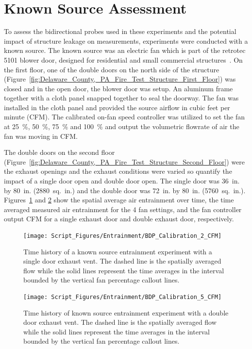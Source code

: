 \documentclass[12pt,oneside]{book}
\begin{document}
\clearpage

\section{Known Source Assessment}
\label{sec:known}

To assess the bidirectional probes used in these experiments and the potential impact of structure leakage on measurements, experiments were conducted with a known source. The known source was an electric fan which is part of the retrotec 5101 blower door, designed for residential and small commercial structures~\cite{RetroTecManual}. On the first floor, one of the double doors on the north side of the structure (Figure~\ref{fig:Delaware_County,_PA_Fire_Test_Structure_First_Floor}) was closed and in the open door, the blower door was setup. An aluminum frame together with a cloth panel snapped together to seal the doorway. The fan was installed in the cloth panel and provided the source airflow in cubic feet per minute (CFM). The calibrated on-fan speed controller was utilized to set the fan at 25~\%, 50~\%, 75~\% and 100~\% and output the volumetric flowrate of air the fan was moving in CFM. 

The double doors on the second floor (Figure~\ref{fig:Delaware_County,_PA_Fire_Test_Structure_Second_Floor}) were the exhaust openings and the exhaust conditions were varied so quantify the impact of a single door open and double door open. The single door was 36~in. by 80~in. (2880~sq.~in.) and the double door was 72~in. by 80~in. (5760~sq.~in.). Figures~\ref{fig:known_single_door} and \ref{fig:known_double_door} show the spatial average air entrainment over time, the time averaged measured air entrainment for the 4 fan settings, and the fan controller output CFM for a single exhaust door and double exhaust door, respectively. 


\begin{figure}[!ht]
\centering
\texttt{[image: Script\_Figures/Entrainment/BDP\_Calibration\_2\_CFM]} 
\caption[Comparison of Known Source to Measured CFM with Single Door Exhaust]{Time history of a known source entrainment experiment with a single door exhaust vent. The dashed line is the spatially averaged flow while the solid lines represent the time averages in the interval bounded by the vertical fan percentage callout lines.}
\label{fig:known_single_door}
\end{figure}

\begin{figure}[!ht]
\centering
\texttt{[image: Script\_Figures/Entrainment/BDP\_Calibration\_5\_CFM]} 
\caption[Comparison of Known Source to Measured CFM with Double Door Exhaust]{Time history of known source entrainment experiment with a double door exhaust vent. The dashed line is the spatially averaged flow while the solid lines represent the time averages in the interval bounded by the vertical fan percentage callout lines.}
\label{fig:known_double_door}
\end{figure}
\end{document}

